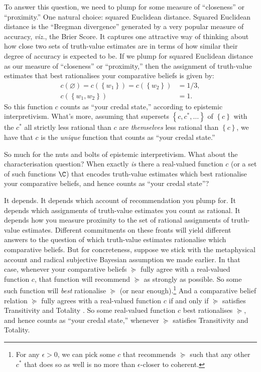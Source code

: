 To answer this question, we need to plump for some measure of ``closeness'' or ``proximity.'' One natural choice: squared Euclidean distance. Squared Euclidean distance is the ``Bregman divergence'' generated by a very popular measure of accuracy, \textit{viz.}, the Brier Score. It captures one attractive way of thinking about how close two sets of truth-value estimates are in terms of how similar their degree of accuracy is expected to be. If we plump for squared Euclidean distance as our measure of ``closeness'' or ``proximity,'' then the assignment of truth-value estimates that best rationalises your comparative beliefs is given by:
$$
\begin{aligned}
	c(\varnothing)=c(\left\{w_1\right\})=c(\left\{w_2\right\}) &= 1/3,\\
	c(\left\{w_1,w_2\right\}) &= 1.
\end{aligned}
$$
So this function $c$ counts as ``your credal state,'' according to epistemic interpretivism. What's more, assuming that supersets $\left\{c,c^*,\hdots\right\}$ of $\left\{c\right\}$ with the $c^*$ all strictly less rational than $c$ are \textit{themselves} less rational than $\left\{c\right\}$, we have that $c$ is the \textit{unique} function that counts as ``your credal state.'' 

So much for the nuts and bolts of epistemic interpretivism. What about the characterisation question? When exactly \textit{is} there a real-valued function $c$ (or a set of such functions $\C$) that encodes truth-value estimates which best rationalise your comparative beliefs, and hence counts as ``your credal state''?

It depends. It depends which account of recommendation you plump for. It depends which assignments of truth-value estimates you count as rational. It depends how you measure proximity to the set of rational assignments of truth-value estimates. Different commitments on these fronts will yield different answers to the question of which truth-value estimates rationalise which comparative beliefs. But for concreteness, suppose we stick with the metaphysical account and radical subjective Bayesian assumption we made earlier. In that case, whenever your comparative beliefs $\succeq$ fully agree with a real-valued function $c$, that function will recommend $\succeq$ as strongly as possible. So some such function will \textit{best} rationalise $\succeq$ (or near enough).\footnote{For any $\epsilon>0$, we can pick some $c$ that recommends $\succeq$ such that any other $c^*$ that does so as well is no more than $\epsilon$-closer to coherent.} And a comparative belief relation $\succeq$ fully agrees with a real-valued function $c$ if and only if $\succeq$ satisfies Transitivity and Totality \citep[Theorem 1]{Krantz1971}. So some real-valued function $c$ best rationalises $\succeq$, and hence counts as ``your credal state,'' whenever $\succeq$ satisfies Transitivity and Totality.

